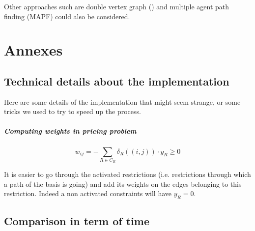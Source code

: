 \documentclass[14pt,a4paper]{article}
\theoremstyle{definition}
\numberwithin{equation}{subsection}
\begin{document}
Other approaches such are double vertex graph (\cite{BachelorThesis}) and multiple agent path finding (MAPF) could also be considered.





\newpage
{}
\section*{Annexes}
\label{sec:annexes}
\subsection*{Technical details about the implementation}

Here are some details of the implementation that might seem strange, or some tricks we used to try to speed up the process.
\subparagraph{Computing weights in pricing problem}
\begin{equation*}
w_{ij} = -\sum_{R \in C_R} \delta_R((i,j))\cdot y_R \geq 0
\end{equation*}

It is easier to go through the activated restrictions (i.e. restrictions through which a path of the basis is going) and add its weights on the edges belonging to this restriction. Indeed a non activated constraints will have $y_R = 0$.
\subsection*{Comparison in term of time}
\end{document}
